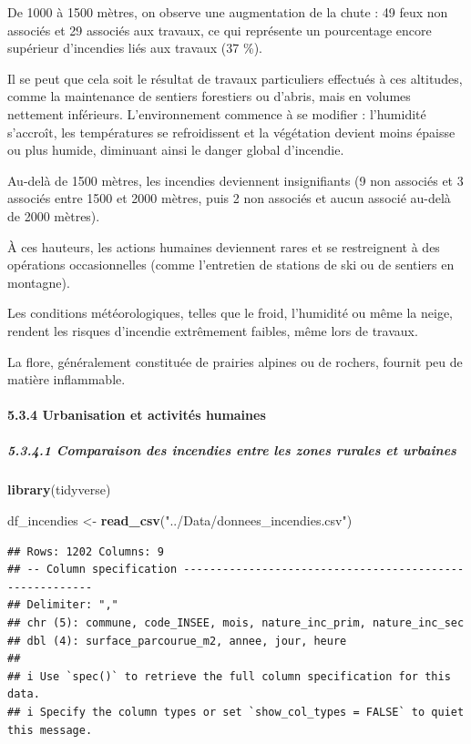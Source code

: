 \documentclass[
]{article}
\newenvironment{Shaded}{\begin{snugshade}}{\end{snugshade}}
\newcommand{\FunctionTok}[1]{\textcolor[rgb]{0.13,0.29,0.53}{\textbf{#1}}}
\newcommand{\NormalTok}[1]{#1}
\newcommand{\OtherTok}[1]{\textcolor[rgb]{0.56,0.35,0.01}{#1}}
\newcommand{\StringTok}[1]{\textcolor[rgb]{0.31,0.60,0.02}{#1}}
\begin{document}
De 1000 à 1500 mètres, on observe une augmentation de la chute : 49 feux
non associés et 29 associés aux travaux, ce qui représente un
pourcentage encore supérieur d'incendies liés aux travaux (37 \%).

Il se peut que cela soit le résultat de travaux particuliers effectués à
ces altitudes, comme la maintenance de sentiers forestiers ou d'abris,
mais en volumes nettement inférieurs. L'environnement commence à se
modifier : l'humidité s'accroît, les températures se refroidissent et la
végétation devient moins épaisse ou plus humide, diminuant ainsi le
danger global d'incendie.

Au-delà de 1500 mètres, les incendies deviennent insignifiants (9 non
associés et 3 associés entre 1500 et 2000 mètres, puis 2 non associés et
aucun associé au-delà de 2000 mètres).

À ces hauteurs, les actions humaines deviennent rares et se restreignent
à des opérations occasionnelles (comme l'entretien de stations de ski ou
de sentiers en montagne).

Les conditions météorologiques, telles que le froid, l'humidité ou même
la neige, rendent les risques d'incendie extrêmement faibles, même lors
de travaux.

La flore, généralement constituée de prairies alpines ou de rochers,
fournit peu de matière inflammable.

\paragraph{5.3.4 Urbanisation et activités
humaines}\label{urbanisation-et-activituxe9s-humaines}

\subparagraph{5.3.4.1 Comparaison des incendies entre les zones rurales
et
urbaines}\label{comparaison-des-incendies-entre-les-zones-rurales-et-urbaines}

\begin{Shaded}
\begin{Highlighting}[]
\FunctionTok{library}\NormalTok{(tidyverse)}

\NormalTok{df\_incendies }\OtherTok{\textless{}{-}} \FunctionTok{read\_csv}\NormalTok{(}\StringTok{"../Data/donnees\_incendies.csv"}\NormalTok{)}
\end{Highlighting}
\end{Shaded}

\begin{verbatim}
## Rows: 1202 Columns: 9
## -- Column specification --------------------------------------------------------
## Delimiter: ","
## chr (5): commune, code_INSEE, mois, nature_inc_prim, nature_inc_sec
## dbl (4): surface_parcourue_m2, annee, jour, heure
## 
## i Use `spec()` to retrieve the full column specification for this data.
## i Specify the column types or set `show_col_types = FALSE` to quiet this message.
\end{verbatim}
\end{document}
